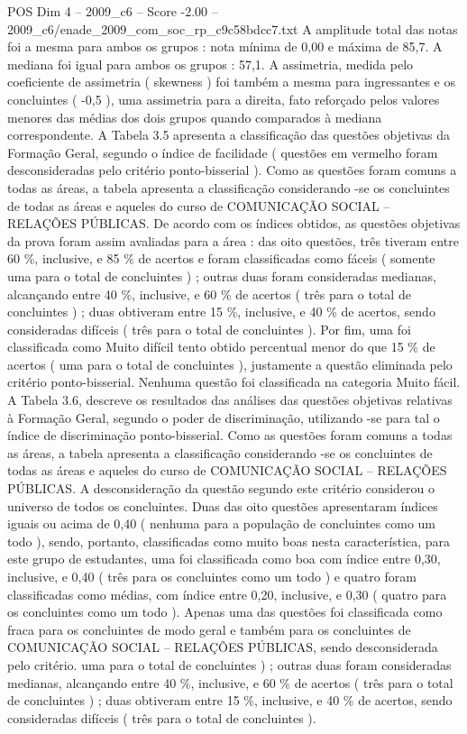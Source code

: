 \begin{textsample}{POS Dim 4 – 2009\_c6 – Score -2.00 – 2009\_c6/enade\_2009\_com\_soc\_rp\_c9c58bdcc7.txt}
A amplitude total das notas foi a mesma para ambos os grupos : nota mínima de 0,00 e máxima de 85,7.
A mediana foi igual para ambos os grupos : 57,1.
A assimetria, medida pelo coeficiente de assimetria ( skewness ) foi também a mesma para ingressantes e os concluintes ( -0,5 ), uma assimetria para a direita, fato reforçado pelos valores menores das médias dos dois grupos quando comparados à mediana correspondente.
A Tabela 3.5 apresenta a classificação das questões objetivas da Formação Geral, segundo o índice de facilidade ( questões em vermelho foram desconsideradas pelo critério ponto-bisserial ).
Como as questões foram comuns a todas as áreas, a tabela apresenta a classificação considerando -se os concluintes de todas as áreas e aqueles do curso de COMUNICAÇÃO SOCIAL – RELAÇÕES PÚBLICAS.
De acordo com os índices obtidos, as questões objetivas da prova foram assim avaliadas para a área : das oito questões, três tiveram entre 60 \%, inclusive, e 85 \% de acertos e foram classificadas como fáceis ( somente uma para o total de concluintes ) ; outras duas foram consideradas medianas, alcançando entre 40 \%, inclusive, e 60 \% de acertos ( três para o total de concluintes ) ; duas obtiveram entre 15 \%, inclusive, e 40 \% de acertos, sendo consideradas difíceis ( três para o total de concluintes ).
Por fim, uma foi classificada como Muito difícil tento obtido percentual menor do que 15 \% de acertos ( uma para o total de concluintes ), justamente a questão eliminada pelo critério ponto-bisserial.
Nenhuma questão foi classificada na categoria Muito fácil.
A Tabela 3.6, descreve os resultados das análises das questões objetivas relativas à Formação Geral, segundo o poder de discriminação, utilizando -se para tal o índice de discriminação ponto-bisserial.
Como as questões foram comuns a todas as áreas, a tabela apresenta a classificação considerando -se os concluintes de todas as áreas e aqueles do curso de COMUNICAÇÃO SOCIAL – RELAÇÕES PÚBLICAS.
A desconsideração da questão segundo este critério considerou o universo de todos os concluintes.
Duas das oito questões apresentaram índices iguais ou acima de 0,40 ( nenhuma para a população de concluintes como um todo ), sendo, portanto, classificadas como muito boas nesta característica, para este grupo de estudantes, uma foi classificada como boa com índice entre 0,30, inclusive, e 0,40 ( três para os concluintes como um todo ) e quatro foram classificadas como médias, com índice entre 0,20, inclusive, e 0,30 ( quatro para os concluintes como um todo ).
Apenas uma das questões foi classificada como fraca para os concluintes de modo geral e também para os concluintes de COMUNICAÇÃO SOCIAL – RELAÇÕES PÚBLICAS, sendo desconsiderada pelo critério. uma para o total de concluintes ) ; outras duas foram consideradas medianas, alcançando entre 40 \%, inclusive, e 60 \% de acertos ( três para o total de concluintes ) ; duas obtiveram entre 15 \%, inclusive, e 40 \% de acertos, sendo consideradas difíceis ( três para o total de concluintes ).

\end{textsample}

